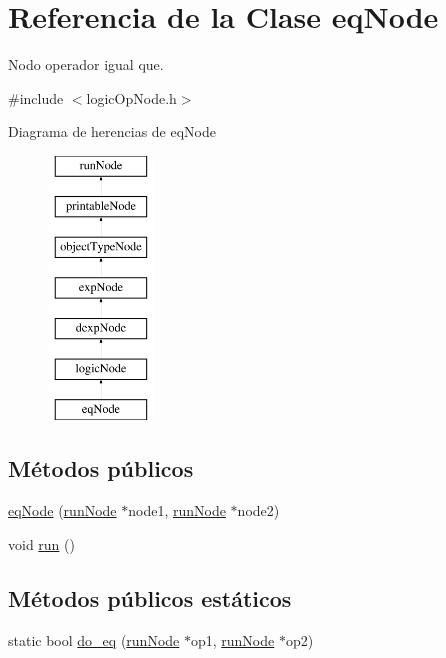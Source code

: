 \hypertarget{classeqNode}{\section{Referencia de la Clase eq\-Node}
\label{classeqNode}
}


Nodo operador igual que.  




{\ttfamily \#include $<$logic\-Op\-Node.\-h$>$}

Diagrama de herencias de eq\-Node\begin{figure}[H]
\begin{center}
\leavevmode
\includegraphics[height=7.000000cm]{classeqNode}
\end{center}
\end{figure}
\subsection*{Métodos públicos}
\begin{DoxyCompactItemize}
\item 
\hyperlink{classeqNode_a8feacf312abba75d46dd634b41719656}{eq\-Node} (\hyperlink{classrunNode}{run\-Node} $\ast$node1, \hyperlink{classrunNode}{run\-Node} $\ast$node2)
\item 
void \hyperlink{classeqNode_a9cbc94f2bc737f97bce1de0acb14c73d}{run} ()
\end{DoxyCompactItemize}
\subsection*{Métodos públicos estáticos}
\begin{DoxyCompactItemize}
\item 
static bool \hyperlink{classeqNode_a7f5ea925683b1d110927db796b3643b1}{do\-\_\-eq} (\hyperlink{classrunNode}{run\-Node} $\ast$op1, \hyperlink{classrunNode}{run\-Node} $\ast$op2)
\end{DoxyCompactItemize}
